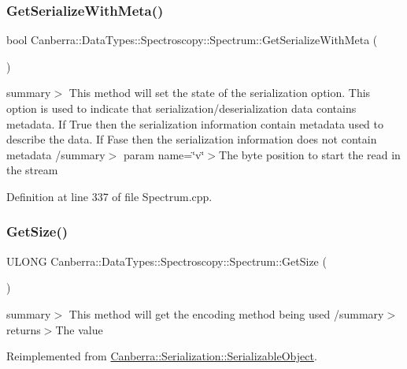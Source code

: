 \subsubsection{\texorpdfstring{Get\+Serialize\+With\+Meta()}{GetSerializeWithMeta()}}
{\footnotesize\ttfamily bool Canberra\+::\+Data\+Types\+::\+Spectroscopy\+::\+Spectrum\+::\+Get\+Serialize\+With\+Meta (\begin{DoxyParamCaption}{ }\end{DoxyParamCaption})}

summary$>$ This method will set the state of the serialization option. This option is used to indicate that serialization/deserialization data contains metadata. If True then the serialization information contain metadata used to describe the data. If Fase then the serialization information does not contain metadata /summary$>$ param name=\char`\"{}v\char`\"{}$>$The byte position to start the read in the stream

Definition at line 337 of file Spectrum.\+cpp.

\mbox{\label{class_canberra_1_1_data_types_1_1_spectroscopy_1_1_spectrum_a95b9306d8163e99c546cbae2afe59785_a95b9306d8163e99c546cbae2afe59785}} 
\subsubsection{\texorpdfstring{Get\+Size()}{GetSize()}}
{\footnotesize\ttfamily U\+L\+O\+NG Canberra\+::\+Data\+Types\+::\+Spectroscopy\+::\+Spectrum\+::\+Get\+Size (\begin{DoxyParamCaption}{ }\end{DoxyParamCaption})\hspace{0.3cm}{\ttfamily [virtual]}}

summary$>$ This method will get the encoding method being used /summary$>$ returns$>$The value

Reimplemented from \hyperlink{class_canberra_1_1_serialization_1_1_serializable_object_a1af5a56d77422d2d6f56d1fb8bc9f376_a1af5a56d77422d2d6f56d1fb8bc9f376}{Canberra\+::\+Serialization\+::\+Serializable\+Object}.



